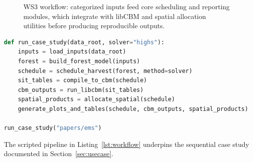 \documentclass[review]{elsarticle}
\begin{document}
\begin{figure}[h]
  \centering
  \caption{WS3 workflow: categorized inputs feed core scheduling and reporting modules, which integrate with libCBM and spatial allocation utilities before producing reproducible outputs.}
  \label{fig:workflow_overview}
\end{figure}

\begin{lstlisting}[float=tb,language=Python,basicstyle=\ttfamily\small,caption={Case-study workflow executed by the reproduction package.},label={lst:workflow}]
def run_case_study(data_root, solver="highs"):
    inputs = load_inputs(data_root)
    forest = build_forest_model(inputs)
    schedule = schedule_harvest(forest, method=solver)
    sit_tables = compile_to_cbm(schedule)
    cbm_outputs = run_libcbm(sit_tables)
    spatial_products = allocate_spatial(schedule)
    generate_plots_and_tables(schedule, cbm_outputs, spatial_products)

run_case_study("papers/ems")
\end{lstlisting}
The scripted pipeline in Listing~\ref{lst:workflow} underpins the sequential case study documented in Section~\ref{sec:usecase}.
\end{document}
